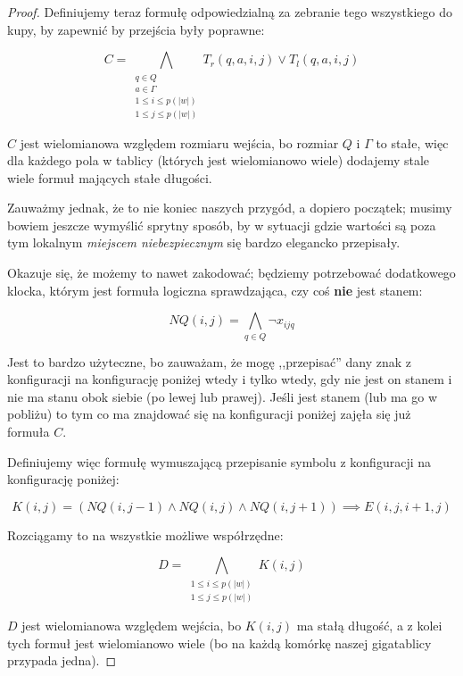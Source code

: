 \begin{proof}
        
        Definiujemy teraz formułę odpowiedzialną za zebranie tego wszystkiego do kupy, by zapewnić by przejścia były poprawne:
        
        \[ 
            C = \bigwedge_{\substack{q \in Q \\ a \in \Gamma \\ 1 \leq i \leq p(|w|) \\ 1 \leq j \leq p(|w|)}} T_r(q,a,i,j) \lor T_l(q,a,i,j) 
        \]
        
        \(C\) jest wielomianowa względem rozmiaru wejścia, bo rozmiar \(Q\) i \(\Gamma\) to stałe, więc dla każdego pola w tablicy (których jest wielomianowo wiele) dodajemy stale wiele formuł mających stałe długości. 
        
        Zauważmy jednak, że to nie koniec naszych przygód, a dopiero początek; musimy bowiem jeszcze wymyślić sprytny sposób, by w sytuacji gdzie wartości są poza tym lokalnym \textit{miejscem niebezpiecznym} się bardzo elegancko przepisały. 
        
        Okazuje się, że możemy to nawet zakodować; będziemy potrzebować dodatkowego klocka, którym jest formuła logiczna sprawdzająca, czy coś \textbf{nie} jest stanem:
        
        \[
            NQ(i,j) = \bigwedge_{q \in Q} \neg x_{ijq}
        \]
        
        Jest to bardzo użyteczne, bo zauważam, że mogę ,,przepisać'' dany znak z konfiguracji na konfigurację poniżej wtedy i tylko wtedy, gdy nie jest on stanem i nie ma stanu obok siebie (po lewej lub prawej). Jeśli jest stanem (lub ma go w pobliżu) to tym co ma znajdować się na konfiguracji poniżej zajęła się już formuła \(C\).
        
        Definiujemy więc formułę wymuszającą przepisanie symbolu z konfiguracji na konfigurację poniżej: 
        
        \[ 
            K(i,j) = (NQ(i, j-1) \land NQ(i,j) \land NQ(i, j+1)) \implies E(i, j, i+1, j)
        \]
        
        Rozciągamy to na wszystkie możliwe współrzędne:
        
        \[ 
            D = \bigwedge_{\substack{1 \leq i \leq p(|w|) \\ 1 \leq j \leq p(|w|)}} K(i,j)
        \]
        
        \(D\) jest wielomianowa względem wejścia, bo \(K(i,j)\) ma stałą długość, a z kolei tych formuł jest wielomianowo wiele (bo na każdą komórkę naszej gigatablicy przypada jedna).
        

\end{proof}
